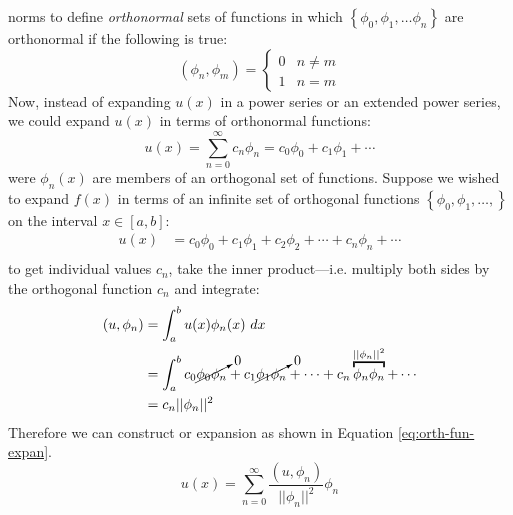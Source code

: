  norms to define \emph{orthonormal} sets of functions in which $\left\{ \phi_0, \phi_1, \dots \phi_n\right\}$ are orthonormal if the following is true:
\begin{equation*}
\left(\phi_n,\phi_m\right) = 
\begin{cases}
0 & n\ne m \\
1 & n=m
\end{cases}
\end{equation*}
Now, instead of expanding $u(x)$ in a power series or an extended power series, we could expand $u(x)$ in terms of orthonormal functions:
\begin{equation*}
u(x) = \sum\limits_{n=0}^{\infty} c_n \phi_n = c_0\phi_0 + c_1\phi_1 + \cdots
\end{equation*}
were $\phi_n(x)$ are members of an orthogonal set of functions. Suppose we wished to expand $f(x)$ in terms of an infinite set of orthogonal functions $\left\{\phi_0,\phi_1,\dots,\right\}$ on the interval $x\in[a,b]$:
\begin{align*}
u(x) &= c_0\phi_0 + c_1\phi_1 + c_2\phi_2 + \cdots + c_n\phi_n + \cdots \\
\end{align*}
to get individual values $c_n$, take the inner product---i.e. multiply both sides by the orthogonal function $c_n$ and integrate:
\begin{align*}
\left(u,\phi_n\right) &= \int_{a}^{b}u(x)\phi_n(x) \ dx \\
&= \int_{a}^{b} c_0 \cancelto{0}{\phi_0 \phi_n} + c_1\cancelto{0}{\phi_1 \phi_n} + \cdots + c_n\overbracket{\phi_n \phi_n}^{||\phi_n||^2} + \cdots \\
&= c_n||\phi_n||^2 
\end{align*}
Therefore we can construct or expansion as shown in Equation \ref{eq:orth-fun-expan}.
\begin{equation}
u(x) = \sum\limits_{n=0}^{\infty}\frac{\left(u,\phi_n\right)}{||\phi_n||^2}\phi_n
\label{eq:orth-fun-expan}
\end{equation}

